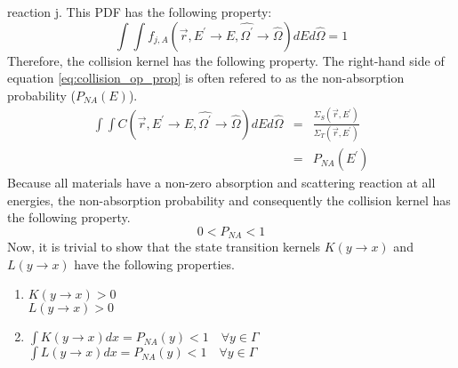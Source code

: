 reaction j. This PDF has the following property:
\begin{equation}
  \int\int f_{j,A}(\vec{r},E^{'} \to E,\hat{\Omega^{'}} \to \hat{\Omega}) 
  dEd\hat{\Omega} = 1
\end{equation}
Therefore, the collision kernel has the following property. The right-hand 
side of equation \ref{eq:collision_op_prop} is often refered to as the 
non-absorption probability ($P_{NA}(E)$).
\begin{eqnarray}
  \int\int C(\vec{r},E^{'} \to E,\hat{\Omega^{'}} \to \hat{\Omega}) 
  dEd\hat{\Omega} & = & \frac{\Sigma_S(\vec{r},E^{'})}{\Sigma_T(\vec{r},E^{'})}
  \label{eq:collision_op_prop} \\
  & = & P_{NA}(E^{'}) \nonumber 
\end{eqnarray}
Because all materials have a non-zero absorption and scattering reaction
at all energies, the non-absorption probability and consequently the 
collision kernel has the following property.
\begin{equation*}
  0 < P_{NA} < 1
\end{equation*}
Now, it is trivial to show that the state transition kernels $K(y \to x)$ and
$L(y \to x)$ have the following properties.
\begin{enumerate}
  \item $K(y \to x) > 0$ \\
    $L(y \to x) > 0$
  \item $\int K(y \to x)dx = P_{NA}(y) < 1 \quad \forall y \in \Gamma$ \\
    $\int L(y \to x)dx = P_{NA}(y) < 1 \quad \forall y \in \Gamma$
\end{enumerate}


